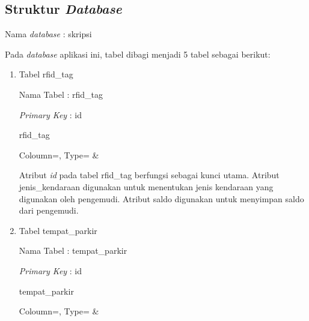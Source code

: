\subsection{Struktur \textit{Database}}
Nama \textit{database} : skripsi

Pada \textit{database} aplikasi ini, tabel dibagi menjadi 5 tabel sebagai berikut:

\begin{enumerate}[topsep=0pt,itemsep=0pt,partopsep=0pt, parsep=0pt]
    \item Tabel rfid\_tag

    Nama Tabel : rfid\_tag

    \textit{Primary Key} : id

    \begin{atable}
        \caption{rfid\_tag}
        \label{table:db_rfid_tag}
            {
                Coloumn=\Coloumn, 
                Type=\Type}
            {
                \Coloumn & 
                \Type}
    \end{atable}

    Atribut \textit{id} pada tabel rfid\_tag berfungsi sebagai kunci utama. Atribut jenis\_kendaraan digunakan untuk menentukan jenis kendaraan yang digunakan oleh pengemudi. Atribut saldo digunakan untuk menyimpan saldo dari pengemudi.

    \item Tabel tempat\_parkir

    Nama Tabel : tempat\_parkir

    \textit{Primary Key} : id

    \begin{table} [H]
        \centering
        \caption{tempat\_parkir}
        \label{table:db_tempat_parkir}
            {
                Coloumn=\Coloumn, 
                Type=\Type}
            {
                \Coloumn & 
                \Type}
    \end{table}


\end{enumerate}
